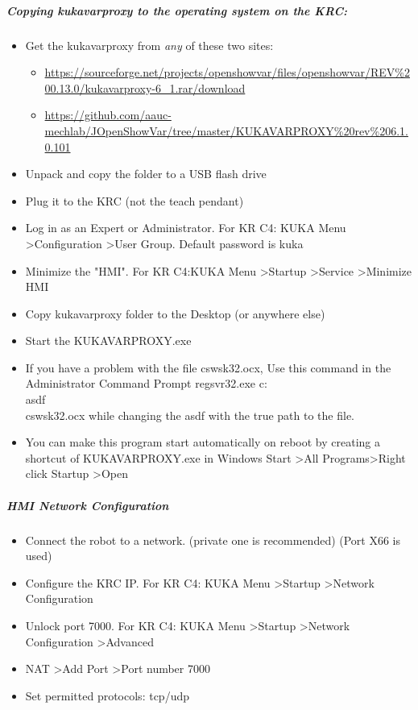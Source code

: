 \subparagraph{Copying kukavarproxy to the operating system on the KRC:}
\begin{itemize}
	\item Get the kukavarproxy from \emph{any} of these two sites:
        \begin{itemize}
            \item\url{https://sourceforge.net/projects/openshowvar/files/openshowvar/REV\%200.13.0/kukavarproxy-6_1.rar/download}
     \item\url{https://github.com/aauc-mechlab/JOpenShowVar/tree/master/KUKAVARPROXY\%20rev\%206.1.0.101}
    \end{itemize}
	\item Unpack and copy the folder to a USB flash drive
	\item Plug it to the KRC (not the teach pendant)
	\item Log in as an Expert or Administrator. For KR C4: KUKA Menu \textgreater Configuration \textgreater User Group. Default password is kuka
	\item Minimize the "HMI". For KR C4:KUKA Menu \textgreater Startup \textgreater Service \textgreater Minimize HMI
	\item Copy kukavarproxy folder to the Desktop (or anywhere else)
	\item Start the KUKAVARPROXY.exe
	\item If you have a problem with the file cswsk32.ocx, Use this command in the Administrator Command Prompt regsvr32.exe c:\\asdf\\cswsk32.ocx while changing the asdf with the true path to the file.
	\item You can make this program start automatically on reboot by creating a shortcut of KUKAVARPROXY.exe in Windows Start \textgreater All Programs\textgreater Right click Startup \textgreater Open
\end{itemize}
\subparagraph{HMI Network Configuration}
\begin{itemize}
	\item Connect the robot to a network. (private one is recommended) (Port X66 is used)
	\item Configure the KRC IP. For KR C4: KUKA Menu \textgreater Startup \textgreater Network Configuration
	\item Unlock port 7000. For KR C4: KUKA Menu \textgreater Startup \textgreater Network Configuration \textgreater Advanced
	\item NAT \textgreater Add Port \textgreater Port number 7000
	\item Set permitted protocols: tcp/udp
	
\end{itemize}
